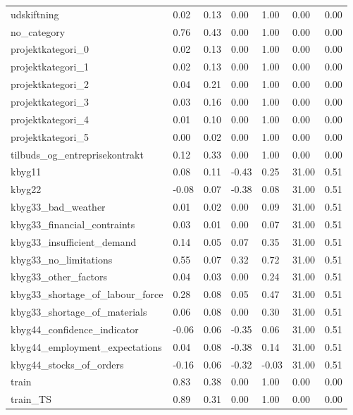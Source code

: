 \begin{landscape}
\begin{longtable}[h!]{lllllll}
udskiftning & 0.02 & 0.13 & 0.00 & 1.00 & 0.00 & 0.00 \\
no_category & 0.76 & 0.43 & 0.00 & 1.00 & 0.00 & 0.00 \\
projektkategori_0 & 0.02 & 0.13 & 0.00 & 1.00 & 0.00 & 0.00 \\
projektkategori_1 & 0.02 & 0.13 & 0.00 & 1.00 & 0.00 & 0.00 \\
projektkategori_2 & 0.04 & 0.21 & 0.00 & 1.00 & 0.00 & 0.00 \\
projektkategori_3 & 0.03 & 0.16 & 0.00 & 1.00 & 0.00 & 0.00 \\
projektkategori_4 & 0.01 & 0.10 & 0.00 & 1.00 & 0.00 & 0.00 \\
projektkategori_5 & 0.00 & 0.02 & 0.00 & 1.00 & 0.00 & 0.00 \\
tilbuds_og_entreprisekontrakt & 0.12 & 0.33 & 0.00 & 1.00 & 0.00 & 0.00 \\
kbyg11 & 0.08 & 0.11 & -0.43 & 0.25 & 31.00 & 0.51 \\
kbyg22 & -0.08 & 0.07 & -0.38 & 0.08 & 31.00 & 0.51 \\
kbyg33_bad_weather & 0.01 & 0.02 & 0.00 & 0.09 & 31.00 & 0.51 \\
kbyg33_financial_contraints & 0.03 & 0.01 & 0.00 & 0.07 & 31.00 & 0.51 \\
kbyg33_insufficient_demand & 0.14 & 0.05 & 0.07 & 0.35 & 31.00 & 0.51 \\
kbyg33_no_limitations & 0.55 & 0.07 & 0.32 & 0.72 & 31.00 & 0.51 \\
kbyg33_other_factors & 0.04 & 0.03 & 0.00 & 0.24 & 31.00 & 0.51 \\
kbyg33_shortage_of_labour_force & 0.28 & 0.08 & 0.05 & 0.47 & 31.00 & 0.51 \\
kbyg33_shortage_of_materials & 0.06 & 0.08 & 0.00 & 0.30 & 31.00 & 0.51 \\
kbyg44_confidence_indicator & -0.06 & 0.06 & -0.35 & 0.06 & 31.00 & 0.51 \\
kbyg44_employment_expectations & 0.04 & 0.08 & -0.38 & 0.14 & 31.00 & 0.51 \\
kbyg44_stocks_of_orders & -0.16 & 0.06 & -0.32 & -0.03 & 31.00 & 0.51 \\
train & 0.83 & 0.38 & 0.00 & 1.00 & 0.00 & 0.00 \\
train_TS & 0.89 & 0.31 & 0.00 & 1.00 & 0.00 & 0.00 \\
\end{longtable}\end{landscape}
